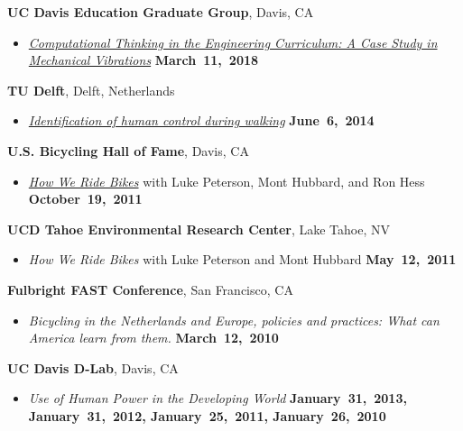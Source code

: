 \documentclass[10pt]{article}
\newenvironment{outerlist}[1][\enskip\textbullet]%
        {\begin{itemize}[#1]}{\end{itemize}%
         \vspace{-.6\baselineskip}}
\newcommand{\blankline}{\quad\pagebreak[2]}
\begin{document}
\blankline

\textbf{UC Davis Education Graduate Group}, Davis, CA
\begin{outerlist}
\item[]
  \href{}{\textit{Computational Thinking in the Engineering Curriculum: A Case
  Study in Mechanical Vibrations}}
    \hfill \textbf{March~11,~2018}
\end{outerlist}

\blankline

\textbf{TU Delft}, Delft, Netherlands
\begin{outerlist}
\item[]
  \href{http://www.moorepants.info/presentations/2014/tu-delft-robotics-talk-2014}{\textit{Identification
  of human control during walking}}
    \hfill \textbf{June~6,~2014}
\end{outerlist}

\blankline

\textbf{U.S. Bicycling Hall of Fame}, Davis, CA
\begin{outerlist}
\item[] \textit{\href{http://mae.ucdavis.edu/~biosport/bhoftalk/}{How We Ride
  Bikes}} with Luke Peterson, Mont Hubbard, and Ron Hess
    \hfill \textbf{October~19,~2011}
\end{outerlist}

\blankline

\textbf{UCD Tahoe Environmental Research Center}, Lake Tahoe, NV
\begin{outerlist}
  \item[] \textit{How We Ride Bikes} with Luke Peterson and Mont Hubbard \hfill
    \textbf{May~12,~2011}
\end{outerlist}

\blankline

\textbf{Fulbright FAST Conference}, San Francisco, CA
\begin{outerlist}
  \item[] \textit{Bicycling in the Netherlands and Europe, policies and
    practices: What can America learn from them.}
    \hfill \textbf{March~12,~2010}
\end{outerlist}

\blankline

\textbf{UC Davis D-Lab}, Davis, CA
\begin{outerlist}
  \item[] \textit{Use of Human Power in the Developing World}
    \hfill \textbf{January~31,~2013, January~31,~2012, January~25,~2011, January~26,~2010}
\end{outerlist}
\end{document}
